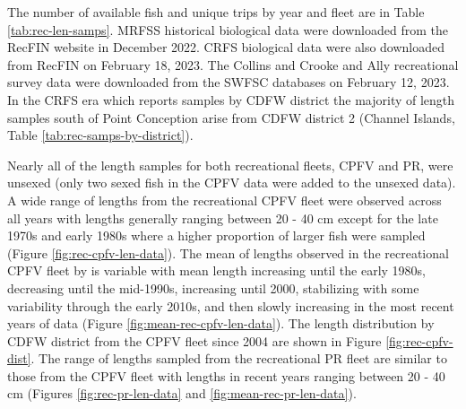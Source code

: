 \documentclass[11pt,
  english,
  letterpaper,
]{article}
\begin{document}
The number of available fish and unique trips by year and fleet are in Table \ref{tab:rec-len-samps}. MRFSS historical biological data were downloaded from the RecFIN website in December 2022. CRFS biological data were also downloaded from RecFIN on February 18, 2023. The Collins and Crooke and Ally recreational survey data were downloaded from the SWFSC databases on February 12, 2023. In the CRFS era which reports samples by CDFW district the majority of length samples south of Point Conception arise from CDFW district 2 (Channel Islands, Table \ref{tab:rec-samps-by-district}).

Nearly all of the length samples for both recreational fleets, CPFV and PR, were unsexed (only two sexed fish in the CPFV data were added to the unsexed data). A wide range of lengths from the recreational CPFV fleet were observed across all years with lengths generally ranging between 20 - 40 cm except for the late 1970s and early 1980s where a higher proportion of larger fish were sampled (Figure \ref{fig:rec-cpfv-len-data}). The mean of lengths observed in the recreational CPFV fleet by is variable with mean length increasing until the early 1980s, decreasing until the mid-1990s, increasing until 2000, stabilizing with some variability through the early 2010s, and then slowly increasing in the most recent years of data (Figure \ref{fig:mean-rec-cpfv-len-data}). The length distribution by CDFW district from the CPFV fleet since 2004 are shown in Figure \ref{fig:rec-cpfv-dist}. The range of lengths sampled from the recreational PR fleet are similar to those from the CPFV fleet with lengths in recent years ranging between 20 - 40 cm (Figures \ref{fig:rec-pr-len-data} and \ref{fig:mean-rec-pr-len-data}).
\end{document}
